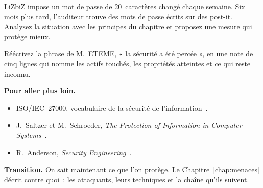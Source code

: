 \begin{boxexo}[title={\ding{45}\quad Exercice~1.9. Acceptabilité \niveauexpert}]
LiZbiZ impose un mot de passe de 20~caractères changé chaque semaine. Six
mois plus tard, l'auditeur trouve des mots de passe écrits sur des
post-it. Analysez la situation avec les principes du chapitre et proposez
une mesure qui protège mieux.
\end{boxexo}

\begin{boxexo}[title={\ding{45}\quad Exercice~1.10. La note du lundi \niveauexpert}]
Réécrivez la phrase de M.~ETEME, « la sécurité a été percée », en une
note de cinq lignes qui nomme les actifs touchés, les propriétés atteintes
et ce qui reste inconnu.
\end{boxexo}

\bigskip

\begin{boxinfo}
\textbf{Pour aller plus loin.}
\begin{itemize}
    \item ISO/IEC~27000, vocabulaire de la sécurité de
          l'information~\cite{iso27000_2018}.
    \item J.~Saltzer et M.~Schroeder, \emph{The Protection of Information
          in Computer Systems}~\cite{saltzer1975}.
    \item R.~Anderson, \emph{Security Engineering}~\cite{anderson2020}.
\end{itemize}
\end{boxinfo}

\begin{boxinfo}
\textbf{Transition.} On sait maintenant ce que l'on protège. Le
Chapitre~\ref{chap:menaces} décrit contre quoi~: les attaquants, leurs
techniques et la chaîne qu'ils suivent.
\end{boxinfo}
